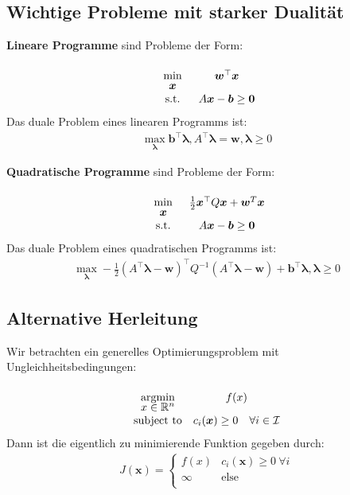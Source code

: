 \documentclass{report}
\newcommand{\tbf}{\textbf}
\newcommand{\argmin}[1] {
    \begin{array}{c}
        \vphantom{#1}\\[-3pt] %
        \text{argmin}\\[-3pt]
        #1\\
        \end{array}
    }
\renewcommand{\min}[1] {
    \begin{array}{c}
        \vphantom{#1}\\[-3pt] %
        \text{min}\\[-3pt]
        #1\\
        \end{array}
    }
\newcommand*{\newpar}{\par\vspace{\baselineskip}\noindent}
\begin{document}
\subsection{Wichtige Probleme mit starker Dualität}
\tbf{Lineare Programme} sind Probleme der Form:
\begin{align*}
\begin{array}{cc}
 \min{\bm{x}} &\bm{w}^{\top} \bm{x}\\
 \text{s.t.} &A \bm{x} - \bm{b} \geq \bm{0}
\end{array}
\end{align*}
Das duale Problem eines linearen Programms ist:
\begin{align*}
 \max_{\bm{\lambda}} \bm{b}^\top \bm{\lambda}, A^\top \bm{\lambda} = \bm{w}, \bm{\lambda} \geq 0
\end{align*}
\newpar
\tbf{Quadratische Programme} sind Probleme der Form:
\begin{align*}
\begin{array}{cc}
 \min{\bm{x}} &\frac{1}{2}\bm{x}^\top Q \bm{x} + \bm{w}^T \bm{x}\\
 \text{s.t.} &A \bm{x} - \bm{b} \geq \bm{0}
\end{array}
\end{align*}
Das duale Problem eines quadratischen Programms ist:
\begin{align*}
 \max_{\bm{\lambda}} -\frac{1}{2}(A^\top \bm{\lambda} - \bm{w})^\top Q^{-1}(A^\top \bm{\lambda} - \bm{w}) + \bm{b}^\top \bm{\lambda}, \bm{\lambda} \geq 0
\end{align*}
%
%
%
\iffalse \subsection{Alternative Herleitung}
Wir betrachten ein generelles Optimierungsproblem mit Ungleichheitsbedingungen:
\begin{align*}
\begin{array}{cc}
\argmin{x \in \mathbb{R}^n} &f(x)\\
 \text{subject to}
 &c_i(\bm{x}) \geq 0 \quad \forall i \in \mathcal{I}\\
\end{array}
\end{align*}
Dann ist die eigentlich zu minimierende Funktion gegeben durch:
\begin{align*}
 J(\bm{x}) = \begin{cases}
              f(x) & c_i(\bm{x}) \geq 0\ \forall i\\
              \infty & \text{else}\\
             \end{cases}
\end{align*}
\end{document}
